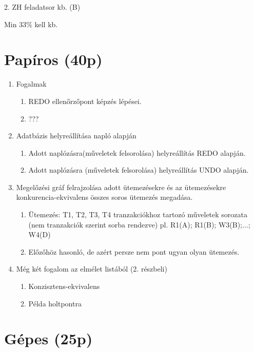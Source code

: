 \documentclass[a4paper,11.5pt, table]{article}
\begin{document}
	\begin{center}
		{\LARGE 2. ZH feladatsor kb. (B)}
		\smallskip
		
		{\large Min 33\% kell kb.}
	\end{center}
\section{Papíros (40p)}

	\begin{enumerate}
		\item Fogalmak
		\begin{enumerate}
			\item REDO ellenőrzőpont képzés lépései.
			\item ???
		\end{enumerate}
	
		\item Adatbázis helyreállítása napló alapján
		\begin{enumerate}
			\item Adott naplózásra(műveletek felsorolása) helyreállítás REDO alapján.
			\item Adott naplózásra (műveletek felsorolása) helyreállítás UNDO alapján.
		\end{enumerate}
	
		\item Megelőzési gráf felrajzolása adott ütemezésekre és az ütemezésekre konkurencia-ekvivalens összes soros ütemezés megadása.
		\begin{enumerate}
			\item Ütemezés: T1, T2, T3, T4 tranzakciókhoz tartozó műveletek sorozata (nem tranzakciók szerint sorba rendezve) pl. R1(A); R1(B); W3(B);...; W4(D)
			\item Előzőhöz hasonló, de azért persze nem pont ugyan olyan ütemezés.
		\end{enumerate}
		\item Még két fogalom az elmélet listából (2. részbeli)
		\begin{enumerate}
			\item Konzisztens-ekvivalens
			\item Példa holtpontra
		\end{enumerate}
	
	\end{enumerate}

\section{Gépes (25p)}
	
\end{document}
